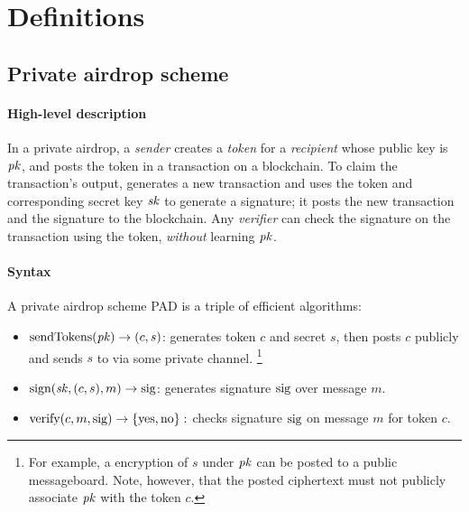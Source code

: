 \section{Definitions}\label{sec:defs}

\subsection{Private airdrop scheme}

\paragraph{High-level description} In a private airdrop, a \emph{sender} \Sr creates a \emph{token}
    for a \emph{recipient} \Rt whose public key is $\mathit{pk}$, and posts
    the token in a transaction on a blockchain.
To claim the transaction's output, \Rt generates a new transaction and
    uses the token and corresponding secret key $\mathit{sk}$ to generate a signature; it posts the
    new transaction and the signature to the blockchain.
Any \emph{verifier} \Vr can check the signature on the transaction
    using the token, \emph{without} learning $\mathit{pk}$.

\paragraph{Syntax} A private airdrop scheme PAD is a triple of efficient algorithms:
%
\begin{itemize}
\item $\text{sendTokens}(\mathit{pk}) \to (c, s)$:
%
\Sr generates token $c$ and secret $s$, then posts $c$ publicly and sends $s$
    to \Rt via some private channel.
\unskip\footnote{For example, a encryption of $s$ under $\mathit{pk}$ can be posted
    to a public messageboard. Note, however, that the posted ciphertext
    must not publicly associate $\mathit{pk}$ with the token $c$.}

\item $\text{sign}(\mathit{sk}, (c, s), m) \to \text{sig}$:
\Rt generates signature $\text{sig}$ over message $m$.

\item $\text{verify}(c, m, \text{sig}) \to \{\text{yes},\text{no}\}:$
\Vr checks signature $\text{sig}$ on message $m$ for token $c$.
\end{itemize}

